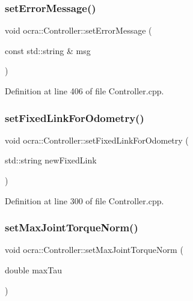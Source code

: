 \subsubsection{\texorpdfstring{set\+Error\+Message()}{setErrorMessage()}}
{\footnotesize\ttfamily void ocra\+::\+Controller\+::set\+Error\+Message (\begin{DoxyParamCaption}\item[{const std\+::string \&}]{msg }\end{DoxyParamCaption})\hspace{0.3cm}{\ttfamily [protected]}}



Definition at line 406 of file Controller.\+cpp.

\hypertarget{classocra_1_1Controller_aac8c56f6b63bb3ae57ac7bf9c23018e8}{}\label{classocra_1_1Controller_aac8c56f6b63bb3ae57ac7bf9c23018e8} 
\subsubsection{\texorpdfstring{set\+Fixed\+Link\+For\+Odometry()}{setFixedLinkForOdometry()}}
{\footnotesize\ttfamily void ocra\+::\+Controller\+::set\+Fixed\+Link\+For\+Odometry (\begin{DoxyParamCaption}\item[{std\+::string}]{new\+Fixed\+Link }\end{DoxyParamCaption})}



Definition at line 300 of file Controller.\+cpp.

\hypertarget{classocra_1_1Controller_a80f0b90e59759bf79fc4ff8c85ca8d85}{}\label{classocra_1_1Controller_a80f0b90e59759bf79fc4ff8c85ca8d85} 
\subsubsection{\texorpdfstring{set\+Max\+Joint\+Torque\+Norm()}{setMaxJointTorqueNorm()}}
{\footnotesize\ttfamily void ocra\+::\+Controller\+::set\+Max\+Joint\+Torque\+Norm (\begin{DoxyParamCaption}\item[{double}]{max\+Tau }\end{DoxyParamCaption})}



